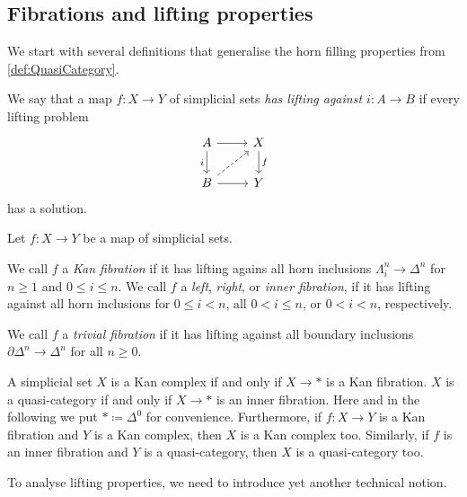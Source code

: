 \subsection{Fibrations and lifting properties}\label{subsec:Fibrations}
We start with several definitions that generalise the horn filling properties from \cref{def:QuasiCategory}.
\begin{defi}\label{def:Lifting}
	We say that a map $f\colon X\rightarrow Y$ of simplicial sets \emph{has lifting against $i\colon A\rightarrow B$} if every lifting problem
	\begin{equation*}
		\begin{tikzcd}
			A\rar\dar["i"']& X\dar["f"]\\
			B\rar\urar[dashed] & Y
		\end{tikzcd}
	\end{equation*}
	has a solution.
\end{defi}
\begin{defi}\label{def:Fibration}
	Let $f\colon X\rightarrow Y$ be a map of simplicial sets.
	\begin{alphanumerate}
		\item We call $f$ a \emph{Kan fibration} if it has lifting agains all horn inclusions $\Lambda_i^n\rightarrow \Delta^n$ for $n\geqslant 1$ and $0\leqslant i\leqslant n$. We call $f$ a \emph{left}, \emph{right}, or \emph{inner fibration}, if it has lifting against all horn inclusions for $0\leqslant i<n$, all $0<i\leqslant n$, or $0<i<n$, respectively.\label{enum:KanFibration}
		\item We call $f$ a \emph{trivial fibration} if it has lifting against all boundary inclusions $\partial\Delta^n\rightarrow\Delta^n$ for all $n\geqslant 0$.\label{enum:TrivialFibration}
	\end{alphanumerate}
\end{defi}
\begin{exm}\label{exm:KanFibration}
	A simplicial set $X$ is a Kan complex if and only if $X\rightarrow *$ is a Kan fibration. $X$ is a quasi-category if and only if $X\rightarrow *$ is an inner fibration. Here and in the following we put $*\coloneqq\Delta^0$ for convenience. Furthermore, if $f\colon X\rightarrow Y$ is a Kan fibration and $Y$ is a Kan complex, then $X$ is a Kan complex too. Similarly, if $f$ is an inner fibration and $Y$ is a quasi-category, then $X$ is a quasi-category too.
\end{exm}
To analyse lifting properties, we need to introduce yet another technical notion.

